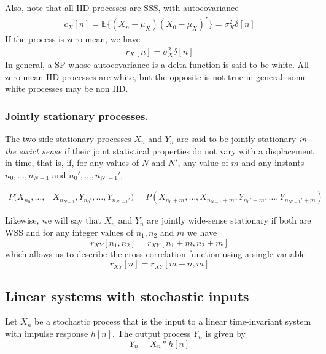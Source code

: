 Also, note that all IID processes are SSS, with autocovariance
\begin{align}
c_X[n] = \mathbb{E}\{(X_n-\mu_X)(X_0-\mu_X)^*\} = \sigma_X^2 \delta[n]
\end{align}
If the process is zero mean, we have
\begin{align}
\label{eq:rxwhiteprocess}
r_X[n] = \sigma_X^2 \delta[n]
\end{align}
In general, a SP whose autocovariance is a delta function is said to be white. All zero-mean IID processes are white, but the opposite is not true in general: some white processes may be non IID.

\subsubsection{Jointly stationary processes.}

The two-side stationary processes $X_n$ and $Y_n$ are said to be jointly stationary \textsl{in the strict sense} if their joint statistical 
properties do not vary with a displacement in time, that is, if, for any values of $N$ and $N'$, any value of $m$ and any instants $n_0,\ldots,n_{N-1}$ and $n_0',\ldots,n_{N'-1}'$,

\begin{align}
P(X_{n_0}, \ldots, & X_{n_{N-1}}, Y_{n_0'}, \ldots, Y_{n_{N'-1}'}) 
           =  P(X_{n_0 + m}, \ldots, X_{n_{N-1} + m}, Y_{n_0' + m}, \ldots, Y_{n_{N'-1}' + m})
\end{align}

Likewise, we will say that $X_n$ and $Y_n$ are jointly wide-sense stationary if both are WSS and for any integer values of $n_1, n_2$ and $m$ we have
\begin{equation}
r_{XY}[n_1,n_2] = r_{XY}[n_1 + m, n_2 + m]
\end{equation}
which allows us to describe the cross-correlation function using a single variable
\begin{equation}
r_{XY}[n] = r_{XY}[m + n, m]
\end{equation}


\subsection{Linear systems with stochastic inputs}
\label{sec:SistemasEntradasStoc}

Let $X_n$ be a stochastic process that is the input to a linear time-invariant system with impulse response $h[n]$. The output process $Y_n$ is given by
\begin{equation}
Y_n = X_n \ast h[n]
\end{equation}

